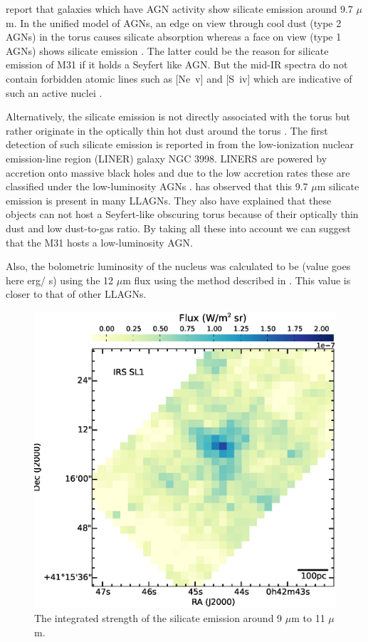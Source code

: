 \citet{Spoon2007} report that galaxies which have AGN activity show silicate emission around 9.7 $\mu$m.
In the unified model of AGNs, an edge on view through cool dust (type 2 AGNs) in the torus causes silicate absorption whereas a face on view (type 1 AGNs) shows silicate emission \citep{AGNtypes1995}. The latter could be the reason for silicate emission of M31 if it holds a Seyfert like AGN. But the mid-IR spectra do not contain forbidden atomic lines such as [Ne~{\sc v}] and [S~{\sc iv}] which are indicative of such an active nuclei \citep{AGNref}.

 Alternatively, the silicate emission is not directly associated with the torus but rather originate in the optically thin hot dust around the torus \citep{Mason2012}. The first detection of such silicate emission is reported in \citet{Sturm2005} from the low-ionization nuclear emission-line region (LINER) galaxy NGC 3998. LINERS are powered by accretion onto massive black holes and due to the low accretion rates these are classified under the low-luminosity AGNs \citep{Kewley2006}. \citealt{Mason2012} has observed that this 9.7 $\mu$m silicate emission is present in many LLAGNs. They also have explained that these objects can not host a Seyfert-like obscuring torus because of their optically thin dust and low dust-to-gas ratio. By taking all these into account we can suggest that the M31 hosts a low-luminosity AGN. 
 
 Also, the bolometric luminosity of the nucleus was calculated to be (value goes here erg/ s) using the 12 $\mu$m flux using the method described in \citet{luminosity}. This value is closer to that of other LLAGNs.



\begin{figure}

\centering
\includegraphics[scale = 0.3]{./NUCsilicate.eps}
\caption{ The integrated strength of the silicate emission around 9 $\mu$m to 11 $\mu$m.}
\label{silicate}
\end{figure}

